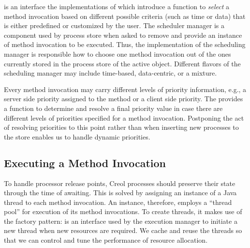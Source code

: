  is an interface the implementations of which
introduce a function to \emph{select} a method invocation based on different
possible criteria (such as time or data) that is either predefined or customized
by the user. The scheduler manager is a component used by process store when
asked to remove and provide an instance of method invocation to be executed.
Thus, the implementation of the scheduling manager is responsible how to choose
one method invocation out of the ones currently stored in the process store of
the active object. Different flavors of the scheduling manager may include
time-based, data-centric, or a mixture.

Every method invocation may carry different levels of priority information,
e.g., a server side priority assigned to the method or a
client side priority. 
The  
provides a function to determine and
resolve a final priority value in case there are different levels of priorities
specified for a method invocation. 
Postponing the act of resolving priorities to this point rather than when inserting new processes to the store enables us to handle dynamic priorities.


\subsection{Executing a Method Invocation}

To handle processor release points, Creol processes should preserve
their state through the time of awaiting.
This is solved by assigning an instance of a Java thread to each method
invocation. 
An  instance, therefore, employs a ``thread pool''
for execution of its method invocations. 
To create threads, it makes use of the factory pattern:
 is an interface used by the execution manager to
initiate a new thread when new resources are required. 
We cache and reuse the threads so that we can control and tune the performance of resource allocation. 

